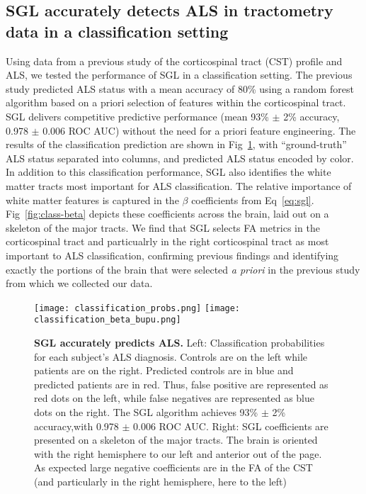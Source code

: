 \subsection*{SGL accurately detects ALS in tractometry data in a classification setting}

Using data from a previous study of the corticospinal tract (CST) profile and
ALS\cite{sarica2017corticospinal}, we tested the performance of SGL in a
classification setting. The previous study predicted ALS status with a mean
accuracy of 80\% using a random forest algorithm based on a priori selection of
features within the corticospinal tract. SGL delivers competitive predictive
performance (mean 93\% $\pm$ 2\% accuracy, 0.978 $\pm$ 0.006 ROC AUC) without
the need for a priori feature engineering. The results of the classification
prediction are shown in Fig~\ref{fig:class-results}, with ``ground-truth'' ALS
status separated into columns, and predicted ALS status encoded by color. In
addition to this classification performance, SGL also identifies the white
matter tracts most important for ALS classification. The relative importance of
white matter features is captured in the $\beta$ coefficients from
Eq~\eqref{eq:sgl}. Fig~\ref{fig:class-beta} depicts these coefficients across
the brain, laid out on a skeleton of the major tracts. We find that SGL selects
FA metrics in the corticospinal tract and particualrly in the right
corticospinal tract as most important to ALS classification, confirming previous
findings\cite{van2011upper, toosy2003diffusion, sarica2014tractography,
sage2007quantitative, sage2009quantitative, karlsborg2004corticospinal,
ellis1999diffusion, cosottini2005diffusion, ciccarelli2009investigation,
abe2010voxel} and identifying exactly the portions of the brain that were
selected \emph{a priori} in the previous study from which we collected our
data\cite{sarica2017corticospinal}.

\begin{figure}[!h]
    \centering
    \texttt{[image: classification\_probs.png]}
    \texttt{[image: classification\_beta\_bupu.png]}

    \caption{{\bf SGL accurately predicts ALS.}
        Left: Classification probabilities for each subject's ALS diagnosis.
        Controls are on the left while patients are on the right. Predicted
        controls are in blue and predicted patients are in red. Thus, false
        positive are represented as red dots on the left, while false negatives
        are represented as blue dots on the right. The SGL algorithm achieves
        93\% $\pm$ 2\% accuracy,with 0.978 $\pm$ 0.006 ROC AUC. Right: SGL
        coefficients are presented on a skeleton of the major tracts. The brain
        is oriented with the right hemisphere to our left and anterior out of
        the page. As expected large negative coefficients are in the FA of the
        CST (and particularly in the right hemisphere, here to the left)}
    \label{fig:class-results}
\end{figure}


